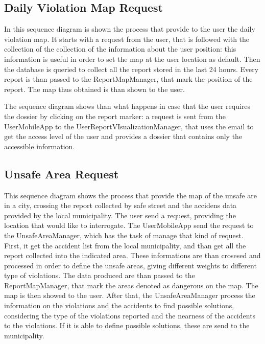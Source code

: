 \documentclass[../RASD.tex]{subfiles}
\begin{document}
    \subsection{Daily Violation Map Request}\label{subsec:daily-violation-map-request}
    \begin{figure}[H]
    \end{figure}
    In this sequence diagram is shown the process that provide to the user the daily violation map. It starts with a request from the user, that is followed with the collection of the collection of the information about the user position: this information is useful in order to set the map at the user location as default. Then the database is queried to collect all the report stored in the last 24 hours. Every report is than passed to the ReportMapManager, that mark the position of the report. The map thus obtained is than shown to the user.

    The sequence diagram shows than what happens in case that the user requires the dossier by clicking on the report marker: a request is sent from the UserMobileApp to the UserReportVIsualizationManager, that uses the email to get the access level of the user and provides a dossier that contains only the accessible information.
    \subsection{Unsafe Area Request}\label{subsec:unsafe-area-request}
    \begin{figure}[H]
    \end{figure}
    This sequence diagram shows the process that provide the map of the unsafe are in a city, crossing the report collected by safe street and the accidens data provided by the local municipality. The user send a request, providing the location that would like to interrogate. The UserMobileApp send the request to the UnsafeAreaManager,  which has the task of manage that kind of request. First, it get the accident list from the local municipality, and than get all the report collected into the indicated area. These informations are than crosesed and processed in order to define the unsafe areas, giving different weights to different type of violations. The data produced are than passed to the ReportMapManager, that mark the areas denoted as dangerous on the map. The map is then showed to the user. After that, the UnsafeAreaManager process the information on the violations and the accidents to find possible solutions, considering the type of the violations reported and the nearness of the accidents to the violations. If it is able to define possible solutions, these are send to the municipality.
\end{document}
